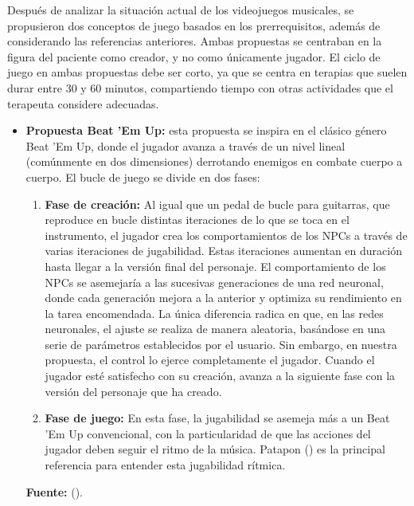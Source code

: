 Después de analizar la situación actual de los videojuegos musicales, se propusieron dos conceptos de juego basados en los prerrequisitos, además de considerando las referencias anteriores. Ambas propuestas se centraban en la figura del paciente como creador, y no como únicamente jugador. El ciclo de juego en ambas propuestas debe ser corto, ya que se centra en terapias que suelen durar entre 30 y 60 minutos, compartiendo tiempo con otras actividades que el terapeuta considere adecuadas.

\begin{itemize}
	\item \textbf{Propuesta Beat 'Em Up:} esta propuesta se inspira en el clásico género Beat 'Em Up, donde el jugador avanza a través de un nivel lineal (comúnmente en dos dimensiones) derrotando enemigos en combate cuerpo a cuerpo. El bucle de juego se divide en dos fases:
	\begin{enumerate}
		\item \textbf{Fase de creación:} Al igual que un pedal de bucle para guitarras, que reproduce en bucle distintas iteraciones de lo que se toca en el instrumento, el jugador crea los comportamientos de los NPCs a través de varias iteraciones de jugabilidad. Estas iteraciones aumentan en duración hasta llegar a la versión final del personaje. El comportamiento de los NPCs se asemejaría a las sucesivas generaciones de una red neuronal, donde cada generación mejora a la anterior y optimiza su rendimiento en la tarea encomendada. La única diferencia radica en que, en las redes neuronales, el ajuste se realiza de manera aleatoria, basándose en una serie de parámetros establecidos por el usuario. Sin embargo, en nuestra propuesta, el control lo ejerce completamente el jugador. Cuando el jugador esté satisfecho con su creación, avanza a la siguiente fase con la versión del personaje que ha creado.
		
		\item \textbf{Fase de juego:} En esta fase, la jugabilidad se asemeja más a un Beat 'Em Up convencional, con la particularidad de que las acciones del jugador deben seguir el ritmo de la música. Patapon (\cite{PATAPON:2007}) es la principal referencia para entender esta jugabilidad rítmica.
	\end{enumerate}
	
	\begin{center}
		\textbf{Fuente:} \citeauthor{PATAPON:2007} (\citeyear{PATAPON:2007}).
		\vspace{-16pt}
	\end{center}
	

\end{itemize}
